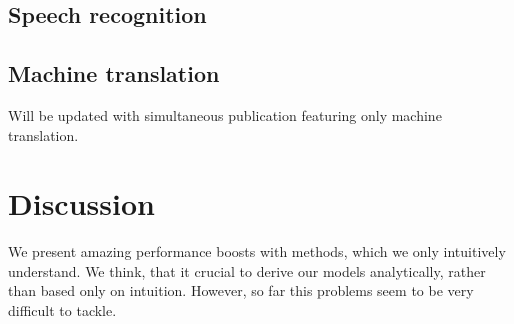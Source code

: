 \documentclass{article}
\begin{document}
\subsection{Speech recognition}
\label{sec:speech}

\subsection{Machine translation}
\label{sec:trans}
Will be updated with simultaneous publication featuring only machine translation.

\section{Discussion}
We present amazing performance boosts with methods, which we 
only intuitively understand. We think, that it crucial
to derive our models analytically, rather than based only on
intuition. However, so far this problems seem to be very difficult to
tackle.




\end{document}
